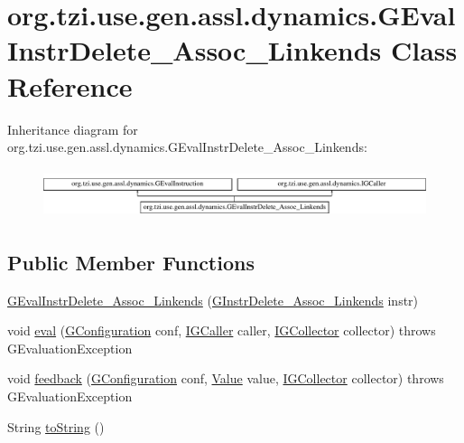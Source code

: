 \hypertarget{classorg_1_1tzi_1_1use_1_1gen_1_1assl_1_1dynamics_1_1_g_eval_instr_delete___assoc___linkends}{\section{org.\-tzi.\-use.\-gen.\-assl.\-dynamics.\-G\-Eval\-Instr\-Delete\-\_\-\-Assoc\-\_\-\-Linkends Class Reference}
\label{classorg_1_1tzi_1_1use_1_1gen_1_1assl_1_1dynamics_1_1_g_eval_instr_delete___assoc___linkends}
}
Inheritance diagram for org.\-tzi.\-use.\-gen.\-assl.\-dynamics.\-G\-Eval\-Instr\-Delete\-\_\-\-Assoc\-\_\-\-Linkends\-:\begin{figure}[H]
\begin{center}
\leavevmode
\includegraphics[height=1.458333cm]{classorg_1_1tzi_1_1use_1_1gen_1_1assl_1_1dynamics_1_1_g_eval_instr_delete___assoc___linkends}
\end{center}
\end{figure}
\subsection*{Public Member Functions}
\begin{DoxyCompactItemize}
\item 
\hyperlink{classorg_1_1tzi_1_1use_1_1gen_1_1assl_1_1dynamics_1_1_g_eval_instr_delete___assoc___linkends_a05037daefc930071a61568095aa05ffb}{G\-Eval\-Instr\-Delete\-\_\-\-Assoc\-\_\-\-Linkends} (\hyperlink{classorg_1_1tzi_1_1use_1_1gen_1_1assl_1_1statics_1_1_g_instr_delete___assoc___linkends}{G\-Instr\-Delete\-\_\-\-Assoc\-\_\-\-Linkends} instr)
\item 
void \hyperlink{classorg_1_1tzi_1_1use_1_1gen_1_1assl_1_1dynamics_1_1_g_eval_instr_delete___assoc___linkends_a9c1e014cba258bb116904bf59a712312}{eval} (\hyperlink{classorg_1_1tzi_1_1use_1_1gen_1_1assl_1_1dynamics_1_1_g_configuration}{G\-Configuration} conf, \hyperlink{interfaceorg_1_1tzi_1_1use_1_1gen_1_1assl_1_1dynamics_1_1_i_g_caller}{I\-G\-Caller} caller, \hyperlink{interfaceorg_1_1tzi_1_1use_1_1gen_1_1assl_1_1dynamics_1_1_i_g_collector}{I\-G\-Collector} collector)  throws G\-Evaluation\-Exception 
\item 
void \hyperlink{classorg_1_1tzi_1_1use_1_1gen_1_1assl_1_1dynamics_1_1_g_eval_instr_delete___assoc___linkends_a17ef7bd98850a26f1bf92c79d1eebddc}{feedback} (\hyperlink{classorg_1_1tzi_1_1use_1_1gen_1_1assl_1_1dynamics_1_1_g_configuration}{G\-Configuration} conf, \hyperlink{classorg_1_1tzi_1_1use_1_1uml_1_1ocl_1_1value_1_1_value}{Value} value, \hyperlink{interfaceorg_1_1tzi_1_1use_1_1gen_1_1assl_1_1dynamics_1_1_i_g_collector}{I\-G\-Collector} collector)  throws G\-Evaluation\-Exception 
\item 
String \hyperlink{classorg_1_1tzi_1_1use_1_1gen_1_1assl_1_1dynamics_1_1_g_eval_instr_delete___assoc___linkends_a102b25e77a6e35af8286f828e654d8be}{to\-String} ()
\end{DoxyCompactItemize}
